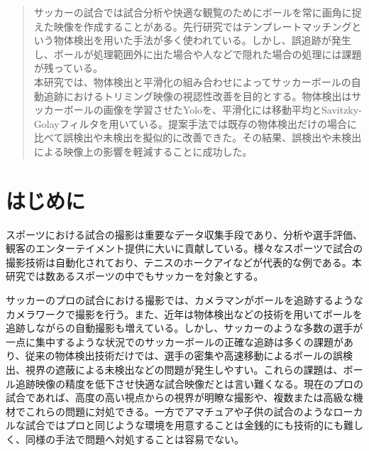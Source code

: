 \documentclass[11pt,a4j]{jreport}
\begin{document}
\begin{abstract}
    サッカーの試合では試合分析や快適な観覧のためにボールを常に画角に捉えた映像を作成することがある。先行研究ではテンプレートマッチングという物体検出を用いた手法が多く使われている。しかし、誤追跡が発生し、ボールが処理範囲外に出た場合や人などで隠れた場合の処理には課題が残っている。\\
    本研究では、物体検出と平滑化の組み合わせによってサッカーボールの自動追跡におけるトリミング映像の視認性改善を目的とする。物体検出はサッカーボールの画像を学習させたYoloを、平滑化には移動平均とSavitzky-Golayフィルタを用いている。提案手法では既存の物体検出だけの場合に比べて誤検出や未検出を擬似的に改善できた。その結果、誤検出や未検出による映像上の影響を軽減することに成功した。
\end{abstract}


\tableofcontents

\pagestyle{fancy}
\lhead{\rightmark}
\renewcommand{\chaptermark}[1]{\markboth{第\ \normalfont\thechapter\ 章~~#1}{}}

\chapter{はじめに}
スポーツにおける試合の撮影は重要なデータ収集手段であり、分析や選手評価、観客のエンターテイメント提供に大いに貢献している。様々なスポーツで試合の撮影技術は自動化されており、テニスのホークアイ\cite{ホークアイ}などが代表的な例である。本研究では数あるスポーツの中でもサッカーを対象とする。

サッカーのプロの試合における撮影では、カメラマンがボールを追跡するようなカメラワークで撮影を行う。また、近年は物体検出などの技術を用いてボールを追跡しながらの自動撮影も増えている。\cite{auto1}しかし、サッカーのような多数の選手が一点に集中するような状況でのサッカーボールの正確な追跡は多くの課題があり、従来の物体検出技術だけでは、選手の密集や高速移動によるボールの誤検出、視界の遮蔽による未検出などの問題が発生しやすい。\cite{切り替えシステム}\cite{高解像度}これらの課題は、ボール追跡映像の精度を低下させ快適な試合映像だとは言い難くなる。現在のプロの試合であれば、高度の高い視点からの視界が明瞭な撮影や、複数または高級な機材でこれらの問題に対処できる。一方でアマチュアや子供の試合のようなローカルな試合ではプロと同じような環境を用意することは金銭的にも技術的にも難しく、同様の手法で問題へ対処することは容易でない。
\end{document}
